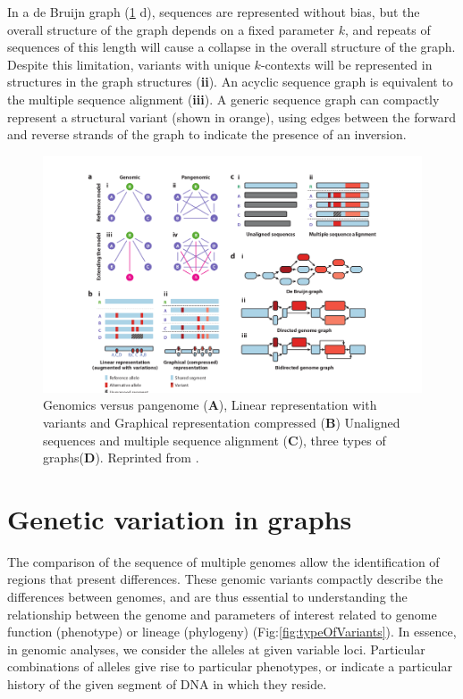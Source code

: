 
In a de Bruijn graph (\ref{fig:genomevspangenome.png} d), sequences are represented without bias, but the overall structure of the graph depends on a fixed parameter $k$, and repeats of sequences of this length will cause a collapse in the overall structure of the graph.
Despite this limitation, variants with unique $k$-contexts will be represented in structures in the graph structures (\textbf{ii}).
An acyclic sequence graph is equivalent to the multiple sequence alignment (\textbf{iii}).
A generic sequence graph can compactly represent a structural variant (shown in orange), using edges between the forward and reverse strands of the graph to indicate the presence of an inversion.


\begin{figure}[H]
\centering
\includegraphics[width=1.00\textwidth]{fig/pangenome_genome.png}
\decoRule
\caption{Genomics versus pangenome (\textbf{A}), Linear representation with variants and Graphical representation compressed (\textbf{B})  Unaligned sequences and multiple sequence alignment (\textbf{C}), three types of graphs(\textbf{D}). Reprinted from \cite{eizenga2020pangenome}.}
\label{fig:genomevspangenome.png}
\end{figure}


\section{Genetic variation in graphs}
The comparison of the sequence of multiple  genomes allow the identification of regions that present differences.
These genomic variants compactly describe the differences between genomes, and are thus essential to understanding the relationship between the genome and parameters of interest related to genome function (phenotype) or lineage (phylogeny) (Fig:\ref{fig:typeOfVariants}).
In essence, in genomic analyses, we consider the alleles at given variable loci.
Particular combinations of alleles give rise to particular phenotypes, or indicate a particular history of the given segment of DNA in which they reside.


